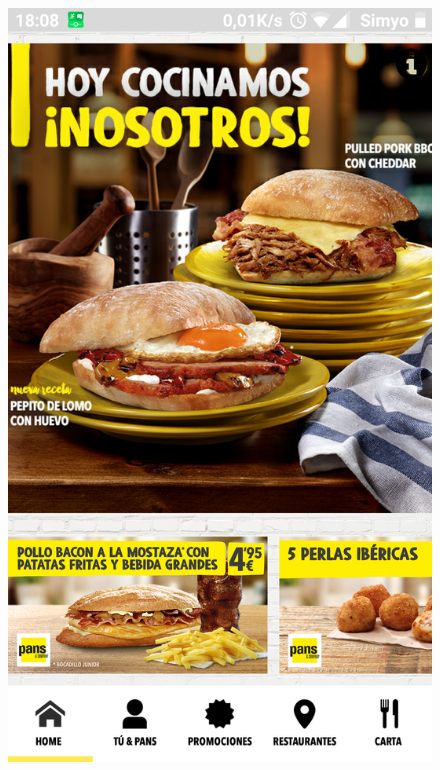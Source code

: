 \documentclass[twoside]{report}
\begin{document}
\begin{figure}[H]
\begin{center}
\includegraphics[scale=0.25]{images/restaurantes/pans0.png}

\end{center}
\end{figure}
\end{document}
